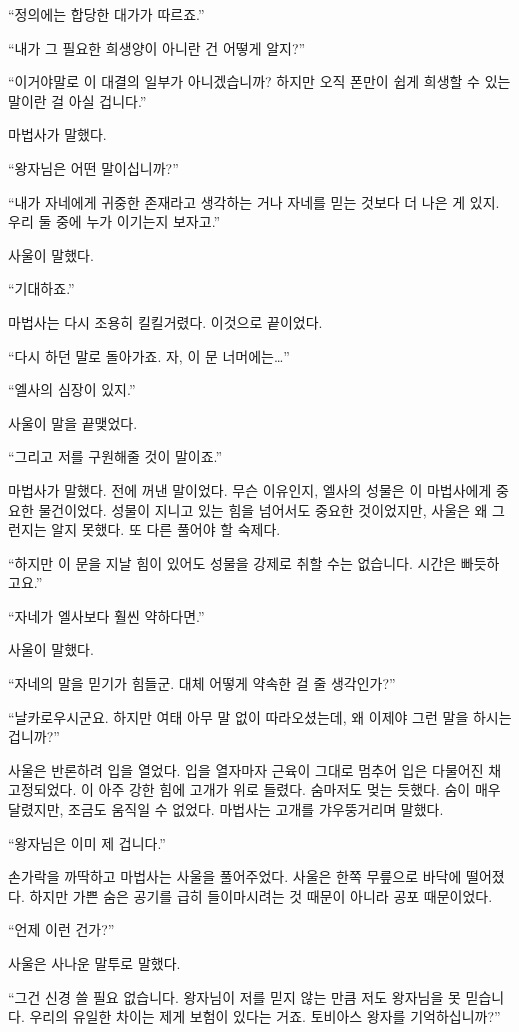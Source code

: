 ``정의에는 합당한 대가가 따르죠.''

``내가 그 필요한 희생양이 아니란 건 어떻게 알지?''

``이거야말로 이 대결의 일부가 아니겠습니까? 하지만 오직 폰만이 쉽게 희생할 수 있는 말이란 걸 아실 겁니다.''

마법사가 말했다.

``왕자님은 어떤 말이십니까?''

``내가 자네에게 귀중한 존재라고 생각하는 거나 자네를 믿는 것보다 더 나은 게 있지. 우리 둘 중에 누가 이기는지 보자고.''

사울이 말했다.

``기대하죠.''

마법사는 다시 조용히 킬킬거렸다. 이것으로 끝이었다.

``다시 하던 말로 돌아가죠. 자, 이 문 너머에는\ldots''

``엘사의 심장이 있지.''

사울이 말을 끝맺었다.

``그리고 저를 구원해줄 것이 말이죠.''

마법사가 말했다. 전에 꺼낸 말이었다. 무슨 이유인지, 엘사의 성물은 이 마법사에게 중요한 물건이었다. 성물이 지니고 있는 힘을 넘어서도 중요한 것이었지만, 사울은 왜 그런지는 알지 못했다. 또 다른 풀어야 할 숙제다.

``하지만 이 문을 지날 힘이 있어도 성물을 강제로 취할 수는 없습니다. 시간은 빠듯하고요.''

``자네가 엘사보다 훨씬 약하다면.''

사울이 말했다.

``자네의 말을 믿기가 힘들군. 대체 어떻게 약속한 걸 줄 생각인가?''

``날카로우시군요. 하지만 여태 아무 말 없이 따라오셨는데, 왜 이제야 그런 말을 하시는 겁니까?''

사울은 반론하려 입을 열었다. 입을 열자마자 근육이 그대로 멈추어 입은 다물어진 채 고정되었다. 이 아주 강한 힘에 고개가 위로 들렸다. 숨마저도 멎는 듯했다. 숨이 매우 달렸지만, 조금도 움직일 수 없었다. 마법사는 고개를 갸우뚱거리며 말했다.

``왕자님은 이미 제 겁니다.''

손가락을 까딱하고 마법사는 사울을 풀어주었다. 사울은 한쪽 무릎으로 바닥에 떨어졌다. 하지만 가쁜 숨은 공기를 급히 들이마시려는 것 때문이 아니라 공포 때문이었다.

``언제 이런 건가?''

사울은 사나운 말투로 말했다.

``그건 신경 쓸 필요 없습니다. 왕자님이 저를 믿지 않는 만큼 저도 왕자님을 못 믿습니다. 우리의 유일한 차이는 제게 보험이 있다는 거죠. 토비아스 왕자를 기억하십니까?''

